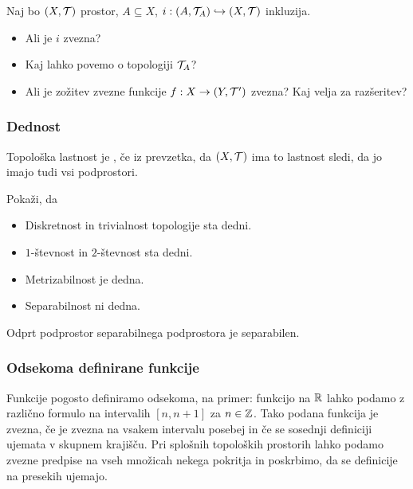 \begin{primer}
    Naj bo $(X, \mathcal{T})$ prostor, $A \subseteq X$, $i: (A, \mathcal{T}_A) \hookrightarrow (X, \mathcal{T})$ inkluzija.
    \begin{itemize}
        \item Ali je $i$ zvezna?
        \item Kaj lahko povemo o topologiji $\mathcal{T}_A$?
        \item Ali je zožitev zvezne funkcije $f: X \to (Y, \mathcal{T}')$ zvezna? Kaj velja za razšeritev?
    \end{itemize}
\end{primer}

\subsubsection{Dednost}
\begin{definicija}
    Topološka lastnost je , če iz prevzetka, da $(X, \mathcal{T})$ ima to lastnost sledi, da jo imajo tudi vsi podprostori.
\end{definicija}

\begin{primer}
    Pokaži, da
    \begin{itemize}
        \item Diskretnost in trivialnost topologije sta dedni.
        \item $1$-števnost in $2$-števnost sta dedni.
        \item Metrizabilnost je dedna.
        \item Separabilnost ni dedna.
    \end{itemize}
\end{primer}

\begin{opomba}
    Odprt podprostor separabilnega podprostora je separabilen.
\end{opomba}

\newpage
\subsubsection{Odsekoma definirane funkcije}
Funkcije pogosto definiramo odsekoma, na primer: funkcijo na $\mathbb{R}$ lahko  podamo z različno formulo na intervalih $[n, n+1]$ za $n \in \mathbb{Z}$. Tako podana funkcija je zvezna, če je zvezna na vsakem intervalu posebej in če se sosednji definiciji ujemata v skupnem krajišču. Pri splošnih topoloških prostorih lahko podamo zvezne predpise na vseh množicah nekega pokritja in poskrbimo, da se definicije na presekih ujemajo.

